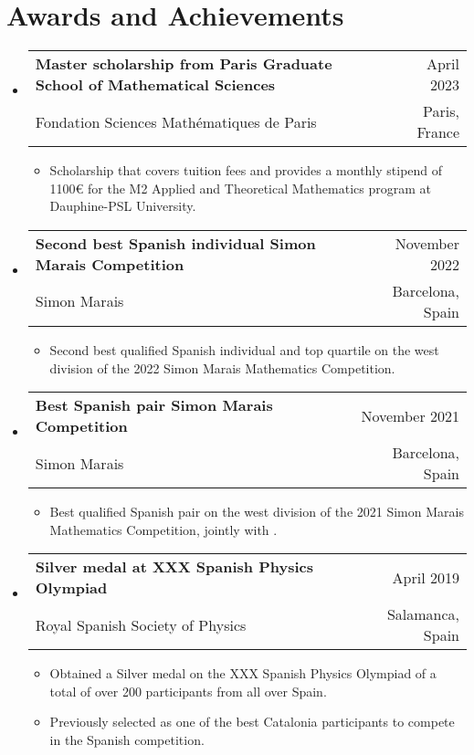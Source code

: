 \documentclass[a4paper,11pt]{article}
\makeatletter
\newcommand{\resumeQuadHeading}[4]{
  \item
  \begin{tabular*}{0.96\textwidth}[t]{l@{\extracolsep{\fill}}r}
    \textbf{#1} & \small #2 \\
    \small#3 & \small #4 \\
  \end{tabular*}
}
\newcommand{\resumeHeadingListStart}{
  \begin{itemize}[leftmargin=0.15in, label={}]
}
\newcommand{\resumeHeadingListEnd}{\end{itemize}}
\makeatother
\begin{document}
\section{Awards and Achievements}
\resumeHeadingListStart{}
\resumeQuadHeading{Master scholarship from Paris Graduate School of Mathematical Sciences}{April 2023}{Fondation Sciences Mathématiques de Paris}{Paris, France}
\begin{itemize}[leftmargin=3em, itemsep=0.1em, topsep=2pt]
  \item \small Scholarship that covers tuition fees and provides a monthly stipend of 1100€ for the M2 Applied and Theoretical Mathematics program at Dauphine-PSL University.
\end{itemize}
\resumeHeadingListEnd{}

\resumeHeadingListStart{}
\resumeQuadHeading{Second best Spanish individual Simon Marais Competition}{November 2022}{Simon Marais}{Barcelona, Spain}
\begin{itemize}[leftmargin=3em, itemsep=0.1em, topsep=2pt]
  \item \small Second best qualified Spanish individual and top quartile on the west division of the 2022 Simon Marais Mathematics Competition.
\end{itemize}
\resumeHeadingListEnd{}

\resumeHeadingListStart{}
\resumeQuadHeading{Best Spanish pair Simon Marais Competition}{November 2021}{Simon Marais}{Barcelona, Spain}
\begin{itemize}[leftmargin=3em, itemsep=0.1em, topsep=2pt]
  \item \small Best qualified Spanish pair on the west division of the 2021 Simon Marais Mathematics Competition, jointly with \href{https://github.com/misaelmalqui}{}.
\end{itemize}
\resumeHeadingListEnd{}

\resumeHeadingListStart{}
\resumeQuadHeading{Silver medal at XXX Spanish Physics Olympiad}{April 2019}{Royal Spanish Society of Physics}{Salamanca, Spain}
\begin{itemize}[leftmargin=3em, itemsep=0.1em, topsep=2pt]
  \item \small Obtained a Silver medal on the XXX Spanish Physics Olympiad of a total of over 200 participants from all over Spain.
  \item \small Previously selected as one of the best Catalonia participants to compete in the Spanish competition.
\end{itemize}
\resumeHeadingListEnd{}
\end{document}
